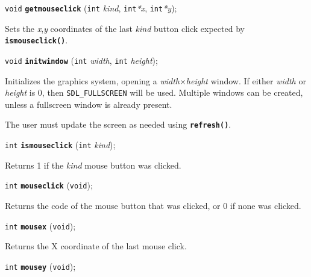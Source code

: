 \documentclass[a4paper,11pt]{article}
\newcommand{\V}{\texttt{void}}      %
\newcommand{\I}{\texttt{int}}       %
\newcommand{\func}[1]{\textbf{\texttt{#1}}}  %
\newcommand{\A}[1]{\emph{#1}}       %
\newcommand{\T}[1]{\texttt{#1}}     %
\newenvironment{bgi}
{ %
  \begin{snugshade}
}
{ %
  \end{snugshade}
}
\begin{document}





\begin{bgi}
\V{} \func{getmouseclick} (\I{} \A{kind}, \I{}\A{*x}, \I{}\A{*y});
\end{bgi}

Sets the \A{x},\A{y} coordinates of the last \A{kind} button click
expected by \func{ismouseclick()}.


\begin{bgi}
\V{} \func{initwindow} (\I{} \A{width}, \I{} \A{height});
\end{bgi}

Initializes the graphics system, opening a \A{width}$\times$\A{height}
window. If either \A{width} or \A{height} is 0, then
\T{SDL\-\_FULL\-SCREEN} will be used. Multiple windows can be created,
unless a fullscreen window is already present.

The user must update the screen as needed using \func{refresh()}.


\begin{bgi}
\I{} \func{ismouseclick} (\I{} \A{kind});
\end{bgi}

Returns 1 if the \A{kind} mouse button was clicked.


\begin{bgi}
\I{} \func{mouseclick} (\V{});
\end{bgi}

Returns the code of the mouse button that was clicked, or 0 if none
was clicked.


\begin{bgi}
\I{} \func{mousex} (\V{});
\end{bgi}

Returns the X coordinate of the last mouse click.


\begin{bgi}
\I{} \func{mousey} (\V{});
\end{bgi}
\end{document}
